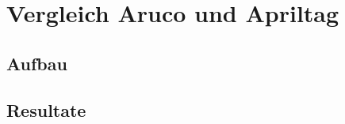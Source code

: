 \section{Vergleich Aruco und Apriltag}

\lipsum[42]


\lipsum[43]
\subsection{Aufbau}

\subsection{Resultate}


